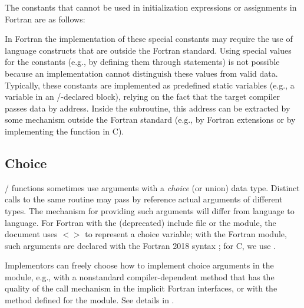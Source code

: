 \noindent The constants that cannot be used in initialization expressions or
assignments in Fortran are as follows:

\begin{constlist}
\end{constlist}

\begin{implementors}
In Fortran the implementation of these special constants may require the
use of language constructs that are outside the Fortran
standard. Using special values for the constants (e.g., by defining
them through  statements) is not possible because an
implementation cannot distinguish these values from valid
data. Typically, these constants are implemented as predefined
static variables (e.g., a variable in an \MPI/-declared 
block), relying on the fact that the target compiler passes data by
address.  Inside the subroutine, this address can be extracted by some
mechanism outside the Fortran standard (e.g., by Fortran extensions or
by implementing the function in C).
\end{implementors}


\subsection{Choice}
\label{sub:choice}

\MPI/ functions sometimes use arguments with a \emph{choice} (or union) data
type.  Distinct calls to the same routine may pass by reference actual
arguments of different types. The mechanism for providing such
arguments will differ from language to language.
For Fortran with the (deprecated) include file  or the  module,
the document uses {$<$$>$} to represent a choice
variable; with the Fortran  module,
such arguments are declared with the
Fortran 2018 syntax
;
for C, we use .

\begin{implementors}
Implementors can freely choose how to implement
choice arguments in the  module,
e.g., with a nonstandard compiler-dependent method that has
the quality of the call mechanism in the implicit Fortran
interfaces, or with the method defined for the  module.
See details in .
\end{implementors}

